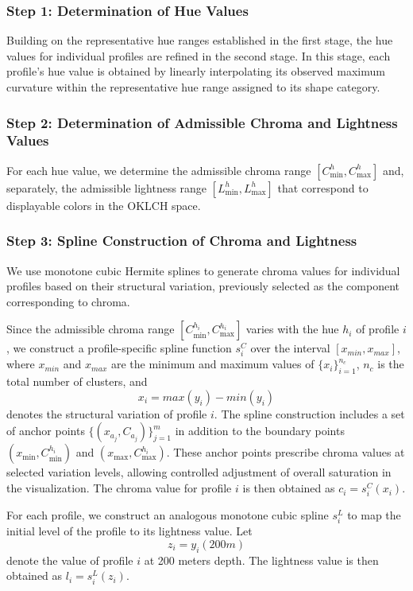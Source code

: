 \documentclass[11pt]{article}
\theoremstyle{plain}
\begin{document}
\subsubsection*{Step 1: Determination of Hue Values} 
Building on the representative hue ranges established in the first stage, the hue values for individual profiles are refined in the second stage. In this stage, each profile’s hue value is obtained by linearly interpolating its observed maximum curvature within the representative hue range assigned to its shape category.

\subsubsection*{Step 2: Determination of Admissible Chroma and Lightness Values}
For each hue value, we determine the admissible chroma range $[C_{\min}^h, C_{\max}^h]$ and, separately, the admissible lightness range $[L_{\min}^h, L_{\max}^h]$ that correspond to displayable colors in the OKLCH space. 

\subsubsection*{Step 3: Spline Construction of Chroma and Lightness}
We use monotone cubic Hermite splines to generate chroma values for individual profiles based on their structural variation, previously selected as the component corresponding to chroma.

Since the admissible chroma range $[C_{\min}^{h_i}, C_{\max}^{h_i}]$ varies with the hue $h_i$ of profile $i$, we construct a profile-specific spline function $s_i^C$ over the interval $[x_{min}, x_{max}]$, where $x_{min}$ and $x_{max}$ are the minimum and maximum values of $\{ x_i \}_{i=1}^{n_c}$, $n_c$ is the total number of clusters, and 
\[
x_i=max(y_i)-min(y_i)
\]
denotes the structural variation of profile $i$. The spline construction includes a set of anchor points $\{(x_{a_j}, C_{a_j})\}_{j=1}^{m}$
in addition to the boundary points $(x_{\min}, C_{\min}^{h_i})$ and $(x_{\max}, C_{\max}^{h_i})$. These anchor points prescribe chroma values at selected variation levels, allowing controlled adjustment of overall saturation in the visualization. The chroma value for profile $i$ is then obtained as  $c_i=s_i^C(x_i)$. 

For each profile, we construct an analogous monotone cubic spline $s_i^L$ to map the initial level of the profile to its lightness value. Let 
\[
z_i=y_i(200m)
\]
denote the value of profile $i$ at 200 meters depth. The lightness value is then obtained as $l_i=s_i^L(z_i)$.  
\end{document}
